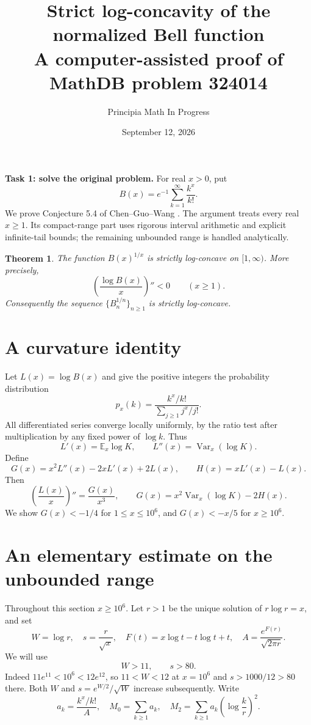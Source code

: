 \documentclass[10pt]{article}
\title{Strict log-concavity of the normalized Bell function\\
\large A computer-assisted proof of MathDB problem 324014}
\author{Principia Math In Progress}
\date{September 12, 2026}
\newtheorem{theorem}{Theorem}
\newcommand{\E}{\mathbb E}
\newcommand{\Var}{\operatorname{Var}}
\begin{document}
\maketitle

\noindent\textbf{Task 1: solve the original problem.}
For real $x>0$, put
\[
 B(x)=e^{-1}\sum_{k=1}^{\infty}\frac{k^x}{k!}.
\]
We prove Conjecture 5.4 of Chen--Guo--Wang
\cite[p.~649]{CGW}. The argument treats every real $x\ge1$.
Its compact-range part uses rigorous interval arithmetic and explicit
infinite-tail bounds; the remaining unbounded range is handled analytically.

\begin{theorem}\label{main}
The function $B(x)^{1/x}$ is strictly log-concave on $[1,\infty)$.
More precisely,
\[
 \left(\frac{\log B(x)}x\right)''<0\qquad(x\ge1).
\]
Consequently the sequence $\{B_n^{1/n}\}_{n\ge1}$ is strictly log-concave.
\end{theorem}

\section{A curvature identity}
Let $L(x)=\log B(x)$ and give the positive integers the probability
distribution
\[
 p_x(k)=\frac{k^x/k!}{\sum_{j\ge1}j^x/j!}.
\]
All differentiated series converge locally uniformly, by the ratio test
after multiplication by any fixed power of $\log k$. Thus
\[
 L'(x)=\E_x\log K,\qquad L''(x)=\Var_x(\log K).
\]
Define
\[
 G(x)=x^2L''(x)-2xL'(x)+2L(x),\qquad H(x)=xL'(x)-L(x).
                                                        \tag{1}
\]
Then
\[
 \left(\frac{L(x)}x\right)''=\frac{G(x)}{x^3},
 \qquad G(x)=x^2\Var_x(\log K)-2H(x).                    \tag{2}
\]
We show $G(x)<-1/4$ for $1\le x\le10^6$, and $G(x)<-x/5$
for $x\ge10^6$.

\section{An elementary estimate on the unbounded range}
Throughout this section $x\ge10^6$. Let $r>1$ be the unique solution of
$r\log r=x$, and set
\[
 W=\log r,\quad s=\frac r{\sqrt{x}},\quad
 F(t)=x\log t-t\log t+t,\quad
 A=\frac{e^{F(r)}}{\sqrt{2\pi r}}.
\]
We will use
\[
 W>11,\qquad s>80.                                      \tag{3}
\]
Indeed $11e^{11}<10^6<12e^{12}$, so $11<W<12$ at $x=10^6$
and $s>1000/12>80$ there. Both $W$ and
$s=e^{W/2}/\sqrt W$ increase subsequently.
Write
\[
 a_k=\frac{k^x/k!}{A},\quad
 M_0=\sum_{k\ge1}a_k,\quad
 M_2=\sum_{k\ge1}a_k\left(\log\frac kr\right)^2.
\]
\end{document}
